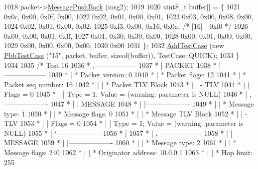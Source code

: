 \begin{DoxyCode}
1018     packet->\hyperlink{classns3_1_1PbbPacket_a4a3170001ef758d9c9c4375b8f089826}{MessagePushBack} (msg2);
1019 
1020     uint8\_t buffer[] = \{
1021       0x0c, 0x00, 0x0f, 0x00,
1022       0x02, 0x01, 0x00, 0x01,
1023       0x03, 0x00, 0x08, 0x00,
1024       0x02, 0x01, 0x00, 0x02,
1025       0xf3, 0x00, 0x16, 0x0a,    \textcolor{comment}{/* [16] - 0xf0 */}
1026       0x00, 0x00, 0x01, 0xff,
1027       0x01, 0x30, 0x39, 0x00,
1028       0x00, 0x01, 0x00, 0x00,
1029       0x00, 0x00, 0x00, 0x00,
1030       0x00
1031     \};
1032     \hyperlink{classns3_1_1TestCase_a3718088e3eefd5d6454569d2e0ddd835}{AddTestCase} (\textcolor{keyword}{new} \hyperlink{classPbbTestCase}{PbbTestCase} (\textcolor{stringliteral}{"15"}, packet, buffer, \textcolor{keyword}{sizeof}(buffer)), 
      TestCase::QUICK);
1033   \}
1034 
1035   \textcolor{comment}{/* Test 16}
1036 \textcolor{comment}{         * ,------------------}
1037 \textcolor{comment}{         * |  PACKET}
1038 \textcolor{comment}{         * |------------------}
1039 \textcolor{comment}{         * | * Packet version:    0}
1040 \textcolor{comment}{         * | * Packet flags:  12}
1041 \textcolor{comment}{         * | * Packet seq number: 16}
1042 \textcolor{comment}{         * |    | * Packet TLV Block}
1043 \textcolor{comment}{         * |    |     - TLV}
1044 \textcolor{comment}{         * |    |         Flags = 0}
1045 \textcolor{comment}{         * |    |         Type = 1; Value = (warning: parameter is NULL)}
1046 \textcolor{comment}{         * |    ,-------------------}
1047 \textcolor{comment}{         * |    |  MESSAGE}
1048 \textcolor{comment}{         * |    |-------------------}
1049 \textcolor{comment}{         * |    | * Message type:       1}
1050 \textcolor{comment}{         * |    | * Message flags:  0}
1051 \textcolor{comment}{         * |    | * Message TLV Block}
1052 \textcolor{comment}{         * |    |     - TLV}
1053 \textcolor{comment}{         * |    |         Flags = 0}
1054 \textcolor{comment}{         * |    |         Type = 1; Value = (warning: parameter is NULL)}
1055 \textcolor{comment}{         * |    `-------------------}
1056 \textcolor{comment}{         * |}
1057 \textcolor{comment}{         * |    ,-------------------}
1058 \textcolor{comment}{         * |    |  MESSAGE}
1059 \textcolor{comment}{         * |    |-------------------}
1060 \textcolor{comment}{         * |    | * Message type:       2}
1061 \textcolor{comment}{         * |    | * Message flags:  240}
1062 \textcolor{comment}{         * |    | * Originator address: 10.0.0.1}
1063 \textcolor{comment}{         * |    | * Hop limit:          255}

\end{DoxyCode}
